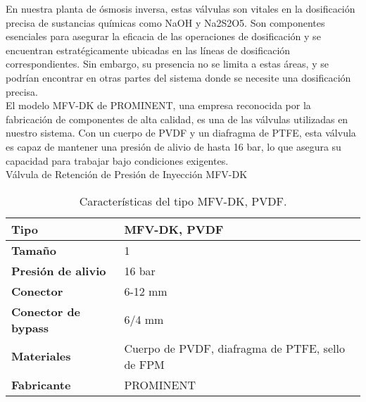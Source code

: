 En nuestra planta de ósmosis inversa, estas válvulas son vitales en la dosificación precisa de sustancias químicas como NaOH y Na2S2O5. Son componentes esenciales para asegurar la eficacia de las operaciones de dosificación y se encuentran estratégicamente ubicadas en las líneas de dosificación correspondientes. Sin embargo, su presencia no se limita a estas áreas, y se podrían encontrar en otras partes del sistema donde se necesite una dosificación precisa.\\

El modelo MFV-DK de PROMINENT, una empresa reconocida por la fabricación de componentes de alta calidad, es una de las válvulas utilizadas en nuestro sistema. Con un cuerpo de PVDF y un diafragma de PTFE, esta válvula es capaz de mantener una presión de alivio de hasta 16 bar, lo que asegura su capacidad para trabajar bajo condiciones exigentes.\\

Válvula de Retención de Presión de Inyección MFV-DK\\

\begin{table}[H]
    \centering
    \caption{Características del tipo MFV-DK, PVDF.}
    \label{table:valvula_retencion}
    \begin{tabular}{| L{6cm} | L{6cm} |}
        \hline
        \textbf{Tipo} & MFV-DK, PVDF \\
        \hline
        \textbf{Tamaño} & 1 \\
        \hline
        \textbf{Presión de alivio} & 16 bar \\
        \hline
        \textbf{Conector} & 6-12 mm \\
        \hline
        \textbf{Conector de bypass} & 6/4 mm \\
        \hline
        \textbf{Materiales} & Cuerpo de PVDF, diafragma de PTFE, sello de FPM \\
        \hline
        \textbf{Fabricante} & PROMINENT \\
        \hline
    \end{tabular}
\end{table}
